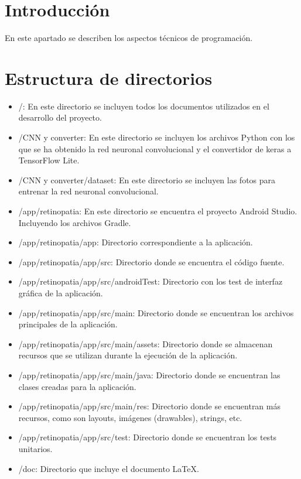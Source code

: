 
\section{Introducción}
 En este apartado se describen los aspectos técnicos de programación.

\section{Estructura de directorios}
\begin{itemize}
    \item /: En este directorio se incluyen todos los documentos utilizados en el desarrollo del proyecto.
    \item /CNN y converter: En este directorio se incluyen los archivos Python con los que se ha obtenido la red neuronal convolucional y  el convertidor de keras a TensorFlow Lite.
    \item /CNN y converter/dataset: En este directorio se incluyen las fotos para entrenar la red neuronal convolucional.
    \item /app/retinopatia: En este directorio se encuentra el proyecto Android Studio. Incluyendo los archivos Gradle.
    \item /app/retinopatia/app: Directorio correspondiente a la aplicación.
    \item /app/retinopatia/app/src: Directorio donde se encuentra el código fuente.
    \item /app/retinopatia/app/src/androidTest: Directorio con los test de interfaz gráfica de la aplicación.
    \item /app/retinopatia/app/src/main: Directorio donde se encuentran los archivos principales de la aplicación.
    \item /app/retinopatia/app/src/main/assets: Directorio donde se almacenan recursos que se utilizan durante la ejecución de la aplicación.
    \item /app/retinopatia/app/src/main/java: Directorio donde se encuentran las clases creadas para la aplicación.
    \item /app/retinopatia/app/src/main/res: Directorio donde se encuentran más recursos, como son layouts, imágenes (drawables), strings, etc.
    \item /app/retinopatia/app/src/test: Directorio donde se encuentran los tests unitarios.
    \item /doc: Directorio que incluye el documento LaTeX.
\end{itemize}
